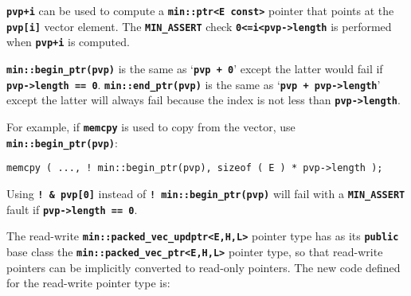 \documentclass[12pt]{article}
\newcommand{\TT}[1]{{\tt \bfseries #1}}
\newcommand{\EOL}{\penalty \exhyphenpenalty}
\newenvironment{indpar}[1][0.3in]%
	{\begin{list}{}%
		     {\setlength{\itemsep}{0in}%
		      \setlength{\topsep}{0in}%
		      \setlength{\parsep}{1ex}%
		      \setlength{\labelwidth}{#1}%
		      \setlength{\leftmargin}{#1}%
		      \addtolength{\leftmargin}{\labelsep}}%
	 \item}%
	{\end{list}}
\begin{document}
\TT{pvp+i} can be used to compute a \TT{min::ptr<E const>} pointer that
points at the \TT{pvp[i]} vector element.
The \TT{MIN\_\EOL ASSERT} check \TT{0<=i<pvp->length}
is performed when \TT{pvp+i} is computed.

\TT{min::begin\_ptr(pvp)} is the same as `\TT{pvp + 0}'
except the latter would fail if \TT{pvp->\EOL length == 0}.
\TT{min::end\_ptr(pvp)} is the same as `\TT{pvp + pvp->length}'
except the latter will always fail because the index is not less than
\TT{pvp->length}.

For example, if \TT{memcpy} is used to copy
from the vector, use \TT{min::begin\_\EOL ptr(pvp)}:
\begin{indpar}\begin{verbatim}
memcpy ( ..., ! min::begin_ptr(pvp), sizeof ( E ) * pvp->length );
\end{verbatim}\end{indpar}
Using \TT{!~\& pvp[0]} instead of \TT{!~min::begin\_ptr(pvp)}
will fail with a \TT{MIN\_\EOL ASSERT} fault if \TT{pvp->\EOL length == 0}.

The read-write \TT{min::\EOL packed\_\EOL vec\_\EOL updptr<E,H,L>}
pointer type has as its \TT{public} base class the
\TT{min::\EOL packed\_\EOL vec\_\EOL ptr<E,H,L>} pointer type,
so that read-write pointers can be implicitly converted to
read-only pointers.  The new code defined for the read-write
pointer type is:
\end{document}
